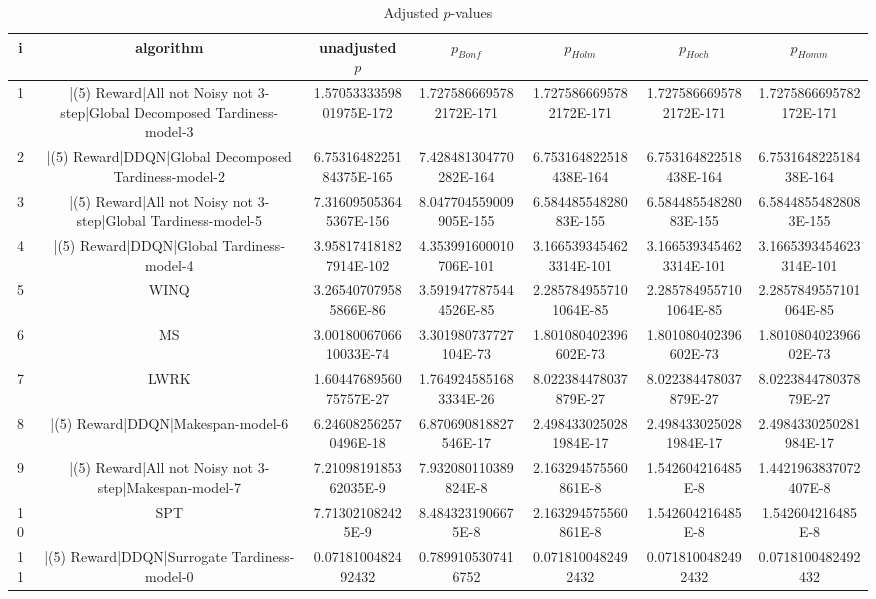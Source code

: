 \documentclass[a3paper,10pt]{article}
\begin{document}
\begin{table}[!htp]
\centering\tiny
\caption{Adjusted $p$-values}
\begin{tabular}{ccccccc}
i&algorithm&unadjusted $p$&$p_{Bonf}$&$p_{Holm}$&$p_{Hoch}$&$p_{Homm}$\\
\hline
1&|(5) Reward|All not Noisy not 3-step|Global Decomposed Tardiness-model-3&1.5705333359801975E-172&1.7275866695782172E-171&1.7275866695782172E-171&1.7275866695782172E-171&1.7275866695782172E-171\\
2&|(5) Reward|DDQN|Global Decomposed Tardiness-model-2&6.7531648225184375E-165&7.428481304770282E-164&6.753164822518438E-164&6.753164822518438E-164&6.753164822518438E-164\\
3&|(5) Reward|All not Noisy not 3-step|Global Tardiness-model-5&7.316095053645367E-156&8.047704559009905E-155&6.58448554828083E-155&6.58448554828083E-155&6.58448554828083E-155\\
4&|(5) Reward|DDQN|Global Tardiness-model-4&3.958174181827914E-102&4.353991600010706E-101&3.1665393454623314E-101&3.1665393454623314E-101&3.1665393454623314E-101\\
5&WINQ&3.265407079585866E-86&3.5919477875444526E-85&2.2857849557101064E-85&2.2857849557101064E-85&2.2857849557101064E-85\\
6&MS&3.0018006706610033E-74&3.301980737727104E-73&1.801080402396602E-73&1.801080402396602E-73&1.801080402396602E-73\\
7&LWRK&1.6044768956075757E-27&1.7649245851683334E-26&8.022384478037879E-27&8.022384478037879E-27&8.022384478037879E-27\\
8&|(5) Reward|DDQN|Makespan-model-6&6.246082562570496E-18&6.870690818827546E-17&2.4984330250281984E-17&2.4984330250281984E-17&2.4984330250281984E-17\\
9&|(5) Reward|All not Noisy not 3-step|Makespan-model-7&7.2109819185362035E-9&7.932080110389824E-8&2.163294575560861E-8&1.542604216485E-8&1.4421963837072407E-8\\
10&SPT&7.713021082425E-9&8.4843231906675E-8&2.163294575560861E-8&1.542604216485E-8&1.542604216485E-8\\
11&|(5) Reward|DDQN|Surrogate Tardiness-model-0&0.0718100482492432&0.7899105307416752&0.0718100482492432&0.0718100482492432&0.0718100482492432\\
\hline
\end{tabular}
\end{table}
\end{document}
